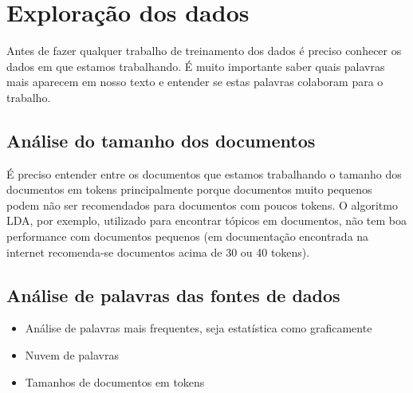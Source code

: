 \section{Exploração dos dados}

Antes de fazer qualquer trabalho de treinamento dos dados é preciso conhecer os dados em que estamos trabalhando. É muito importante saber quais 
palavras mais aparecem em nosso texto e entender se estas palavras colaboram para o trabalho.

\subsection{Análise do tamanho dos documentos}

É preciso entender entre os documentos que estamos trabalhando o tamanho dos documentos em tokens principalmente porque documentos muito pequenos podem
não ser recomendados para documentos com poucos tokens. O algoritmo LDA, por exemplo, utilizado para encontrar tópicos em documentos, não tem boa performance
com documentos pequenos (em documentação encontrada na internet recomenda-se documentos acima de 30 ou 40 tokens).

\subsection{Análise de palavras das fontes de dados}

\begin{itemize}
    \item Análise de palavras mais frequentes, seja estatística como graficamente
    \item Nuvem de palavras
    \item Tamanhos de documentos em tokens
\end{itemize}